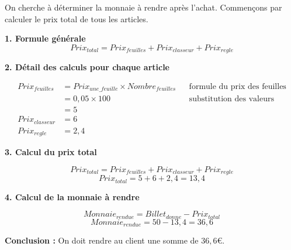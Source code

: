 \documentclass[answers]{exam}
\begin{document}
\begin{solution}

On cherche à déterminer la monnaie à rendre après l’achat.  
Commençons par calculer le prix total de tous les articles.

\bigskip
\textbf{1. Formule générale}
\[
Prix_{total} = Prix_{feuilles} + Prix_{classeur} + Prix_{regle}
\]

\bigskip
\textbf{2. Détail des calculs pour chaque article}

\begin{align*}
Prix_{feuilles} &= Prix_{une\_feuille} \times Nombre_{feuilles} && \text{formule du prix des feuilles}\\
                &= 0,05 \times 100 && \text{substitution des valeurs}\\
                &= 5\\[6pt]
Prix_{classeur} &= 6\\[6pt]
Prix_{regle} &= 2,4
\end{align*}

\bigskip
\textbf{3. Calcul du prix total}

\[
Prix_{total} = Prix_{feuilles} + Prix_{classeur} + Prix_{regle}
\]
\[
Prix_{total} = 5 + 6 + 2,4 = 13,4
\]

\bigskip
\textbf{4. Calcul de la monnaie à rendre}

\[
Monnaie_{rendue} = Billet_{donne} - Prix_{total}
\]
\[
Monnaie_{rendue} = 50 - 13,4 = 36,6
\]

\bigskip
\textbf{Conclusion :}  
On doit rendre au client une somme de \(36,6\)€.
\end{solution}
\end{document}
